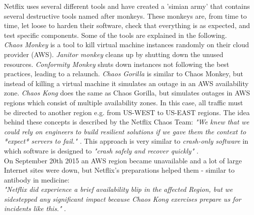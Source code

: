 \noindent
Netflix uses several different tools and have created a 'simian army' that contains several destructive tools named after monkeys. These monkeys are, from time to time, let loose to harden their software, check that everything is as expected, and test specific components. Some of the tools are explained in the following. \\
\textit{Chaos Monkey} is a tool to kill virtual machine instances randomly on their cloud provider (AWS). \textit{Janitor monkey} cleans up by shutting down the unused resources. \textit{Conformity Monkey} shuts down instances not following the best practices, leading to a relaunch. \textit{Chaos Gorilla} is similar to Chaos Monkey, but instead of killing a virtual machine it simulates an outage in an AWS availability zone. \textit{Chaos Kong} does the same as Chaos Gorilla, but simulates outages in AWS regions which consist of multiple availability zones. In this case, all traffic must be directed to another region e.g. from US-WEST to US-EAST regions.
The idea behind these concepts is described by the Netflix Chaos Team:
\textit{"We knew that we could rely on engineers to build resilient solutions if we gave them the context to *expect* servers to fail." \cite{basiri2015chaosengineering}}. This approach is very similar to \textit{crash-only software} in which software is designed to \textit{"crash safely and recover quickly" \cite[p. 1]{candea2003crashonly}}. \\
 
 \noindent On September 20th 2015 an AWS region became unavailable and a lot of large Internet sites were down, but Netflix's preparations helped them - similar to antibody in medicine: \\
 \textit{"Netflix did experience a brief availability blip in the affected Region, but we sidestepped any significant impact because Chaos Kong exercises prepare us for incidents like this."} \cite{basiri2015chaosengineering}.